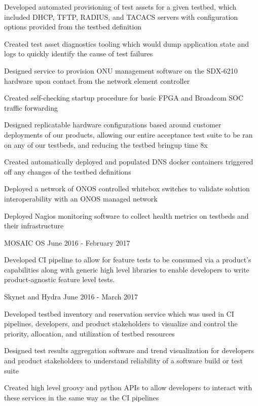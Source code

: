 \begin{cventries}
{\begin{cvitems}
        \item {Developed automated provisioning of test assets for a given testbed, which included DHCP, TFTP, RADIUS, and TACACS servers with configuration options provided from the testbed definition}
        \item {Created test asset diagnostics tooling which would dump application state and logs to quickly identify the cause of test failures}
        \item {Designed service to provision ONU management software on the SDX-6210 hardware upon contact from the network element controller}
        \item {Created self-checking startup procedure for basic FPGA and Broadcom SOC traffic forwarding}
        \item {Designed replicatable hardware configurations based around customer deployments of our products, allowing our entire acceptance test suite to be ran on any of our testbeds, and reducing the testbed bringup time 8x}
        \item {Created automatically deployed and populated DNS docker containers triggered off any changes of the testbed definitions}
        \item {Deployed a network of ONOS controlled whitebox switches to validate solution interoperability with an ONOS managed network}
        \item {Deployed Nagios monitoring software to collect health metrics on testbeds and their infrastructure}
      \end{cvitems}
    }

  \cventry
    {} {MOSAIC OS} {} {June 2016 - February 2017} {
      \begin{cvitems}
        \item {Developed CI pipeline to allow for feature tests to be consumed via a product's capabilities along with generic high level libraries to enable developers to write product-agnostic feature level tests.}
      \end{cvitems}
    }

  \cventry
    {} {Skynet and Hydra} {} {June 2016 - March 2017} {
      \begin{cvitems} %
        \item {Developed testbed inventory and reservation service which was used in CI pipelines, developers, and product stakeholders to visualize and control the priority, allocation, and utilization of testbed resources}
        \item {Designed test results aggregation software and trend visualization for developers and product stakeholders to understand reliability of a software build or test suite}
        \item {Created high level groovy and python APIs to allow developers to interact with these services in the same way as the CI pipelines}
      \end{cvitems}
    }

\end{cventries}
